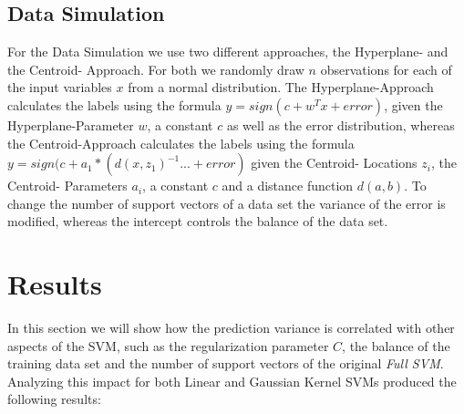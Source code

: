 \documentclass[a4paper]{article}
\begin{document}
\subsection{Data Simulation}
For the Data Simulation we use two different approaches, the Hyperplane- and the Centroid- Approach. For both we randomly draw $n$ observations for each of the input variables $x$ from a normal distribution. The Hyperplane-Approach calculates the labels using the formula $y= sign(c+ w^T x + error)$, given the Hyperplane-Parameter $w$, a constant $c$ as well as the error distribution, whereas the Centroid-Approach calculates the labels using the formula $y= sign(c + a_1*(d(x,z_1)^{-1}... + error)$ given the Centroid- Locations $z_i$, the Centroid- Parameters  $a_i$, a constant $c$ and a distance function $d(a,b)$.
To change the number of support vectors of a data set the variance of the error is modified, whereas the intercept controls the balance of the data set.


\section{Results}

In this section we will show how the prediction variance is correlated with other aspects of the SVM, such as the regularization parameter $C$, the balance of the training data set and the number of support vectors of the original \textit{Full SVM}. Analyzing this impact for both Linear  and Gaussian Kernel SVMs produced the following results:
\end{document}
